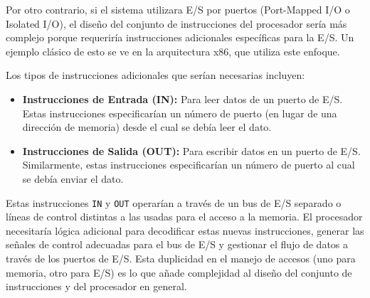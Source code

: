 \documentclass[12pt, a4paper]{article}
\begin{document}
Por otro contrario, si el sistema utilizara E/S por puertos (Port-Mapped I/O o Isolated I/O), el diseño del conjunto de instrucciones del procesador sería más complejo porque requeriría instrucciones adicionales específicas para la E/S. Un ejemplo clásico de esto se ve en la arquitectura x86, que utiliza este enfoque.

Los tipos de instrucciones adicionales que serían necesarias incluyen:
\begin{itemize}
    \item \textbf{Instrucciones de Entrada (IN):} Para leer datos de un puerto de E/S. Estas instrucciones especificarían un número de puerto (en lugar de una dirección de memoria) desde el cual se debía leer el dato.
    \item \textbf{Instrucciones de Salida (OUT):} Para escribir datos en un puerto de E/S. Similarmente, estas instrucciones especificarían un número de puerto al cual se debía enviar el dato.
\end{itemize}
Estas instrucciones \texttt{IN} y \texttt{OUT} operarían a través de un bus de E/S separado o líneas de control distintas a las usadas para el acceso a la memoria. El procesador necesitaría lógica adicional para decodificar estas nuevas instrucciones, generar las señales de control adecuadas para el bus de E/S y gestionar el flujo de datos a través de los puertos de E/S. Esta duplicidad en el manejo de accesos (uno para memoria, otro para E/S) es lo que añade complejidad al diseño del conjunto de instrucciones y del procesador en general.
\end{document}
